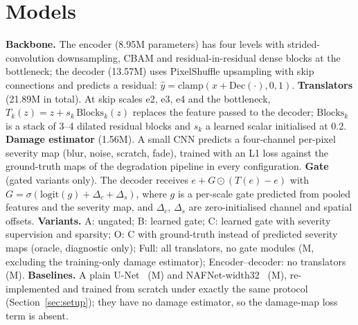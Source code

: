 \documentclass[conference]{IEEEtran}
\begin{document}
\section{Models}
\textbf{Backbone.} The encoder (8.95M parameters) has four levels with strided-convolution downsampling, CBAM and
residual-in-residual dense blocks at the bottleneck; the decoder (13.57M) uses PixelShuffle upsampling with skip
connections and predicts a residual: $\hat{y}=\mathrm{clamp}(x+\mathrm{Dec}(\cdot),0,1)$.
\textbf{Translators} (21.89M in total). At skip scales e2, e3, e4 and the bottleneck, $T_k(z)=z+s_k\,
\mathrm{Blocks}_k(z)$ replaces the feature passed to the decoder; $\mathrm{Blocks}_k$ is a stack of 3--4 dilated
residual blocks and $s_k$ a learned scalar initialised at 0.2.
\textbf{Damage estimator} (1.56M). A small CNN predicts a four-channel per-pixel severity map (blur, noise,
scratch, fade), trained with an L1 loss against the ground-truth maps of the degradation pipeline in every
configuration.
\textbf{Gate} (gated variants only). The decoder receives $e+G\odot(T(e)-e)$ with
$G=\sigma(\mathrm{logit}(g)+\Delta_c+\Delta_s)$, where $g$ is a per-scale gate predicted from pooled features and
the severity map, and $\Delta_c$, $\Delta_s$ are zero-initialised channel and spatial offsets.
\textbf{Variants.} A: ungated; B: learned gate; C: learned gate with severity supervision and sparsity; O: C with
ground-truth instead of predicted severity maps (oracle, diagnostic only); Full: all translators, no gate modules
(\nParamsFull{}M, excluding the training-only damage estimator); Encoder--decoder: no translators (\nParamsEncdec{}M).
\textbf{Baselines.} A plain U-Net~\cite{ronneberger2015unet} (\nParamsUnet{}M) and NAFNet-width32~\cite{chen2022nafnet}
(\nParamsNaf{}M), re-implemented and trained from scratch under exactly the same protocol (Section~\ref{sec:setup}); they have no damage estimator, so the damage-map loss term is absent.
\end{document}

